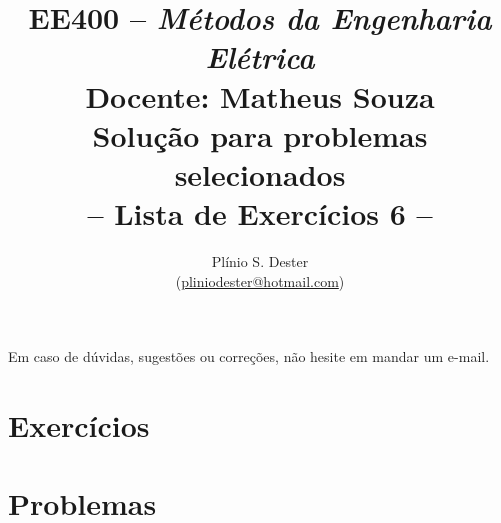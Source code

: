 \documentclass[answers, 12pt]{exam}
\title{	%
        EE400 -- \textit{Métodos da Engenharia Elétrica} \\[-0mm]
        {\Large Docente: Matheus Souza} \\[+1mm]
        {\Large Solução para problemas selecionados}\\[-0mm]
        -- Lista de Exercícios 6 --
}
\author{Plínio S. Dester\\ (\url{pliniodester@hotmail.com})}
\begin{document}
\maketitle

Em caso de dúvidas, sugestões ou correções, não hesite em mandar um e-mail.


\setcounter{section}{5}
\section{Exercícios}


\setcounter{section}{5}
\section{Problemas}


% 
\end{document}
